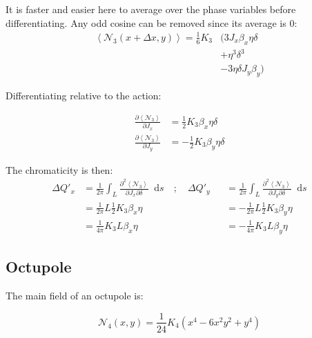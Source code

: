 \documentclass[12pt,a4,]{article}
\numberwithin{equation}{subsection}
\newcommand*\diff{\mathop{}\!\mathrm{d}}
\begin{document}
It is faster and easier here to average over the phase variables before
differentiating. Any odd cosine can be removed since its average is 0:
\begin{equation}\begin{aligned}
  \left< \mathcal{N_3}(x + \Delta x, y) \right> = \frac{1}{6} K_3 &\biggl(
       3 J_x \beta_x \eta \delta \\
  &    + \eta^3 \delta^3 \\
  &    - 3 \eta \delta J_y \beta_y \biggl)
\end{aligned}\end{equation}

\vspace{.5cm}

Differentiating relative to the action:

\begin{equation}\begin{aligned}
\frac{\partial \left< \mathcal{N_3} \right>}{\partial J_x} &= \frac{1}{2} K_3 \beta_x \eta \delta \\
\frac{\partial \left< \mathcal{N_3} \right>}{\partial J_y} &= - \frac{1}{2} K_3 \beta_y \eta \delta
\end{aligned}\end{equation}

The chromaticity is then: \begin{equation}\begin{aligned}
\Delta Q'_x &= \frac{1}{2\pi} \int_L \frac{\partial^2 \left< \mathcal{N_3} \right>}{\partial J_x \partial \delta} \diff s \quad; \quad \Delta Q'_y &&= \frac{1}{2\pi} \int_L \frac{\partial^2 \left< \mathcal{N_3} \right>}{\partial J_y \partial \delta} \diff s \\
&= \frac{1}{2 \pi} L \frac{1}{2} K_3 \beta_x \eta  &&= - \frac{1}{2 \pi} L \frac{1}{2} K_3 \beta_y \eta \\
&= \frac{1}{4 \pi}  K_3 L \beta_x \eta &&= - \frac{1}{4 \pi}  K_3 L \beta_y \eta
\end{aligned}\end{equation}

\hypertarget{octupole-1}{%
\subsection{Octupole}\label{octupole-1}}

The main field of an octupole is:

\begin{equation}\mathcal{N}_4(x, y) = \frac{1}{24} K_4 (x^4 - 6x^2y^2 + y^4)\end{equation}
\end{document}
